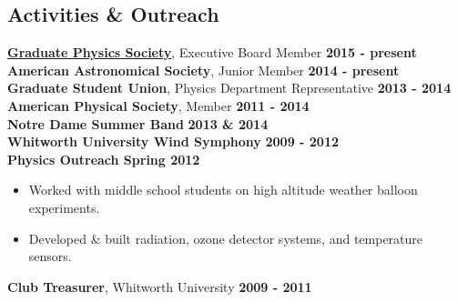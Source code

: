 \documentclass[margin]{res}
\begin{document}
\begin{resume}
\section{Activities \& Outreach}
{\bf \href{www.nd.edu/~gps}{Graduate Physics Society}}, Executive Board Member \hfill {\bf 2015 - present }\\
{\bf American Astronomical Society}, Junior Member  \hfill {\bf 2014 - present }\\
{\bf Graduate Student Union}, Physics Department Representative  \hfill {\bf 2013 - 2014 }\\
{\bf American Physical Society}, Member  \hfill {\bf 2011 - 2014 }\\
{\bf Notre Dame Summer Band} \hfill {\bf 2013 \&  2014 }\\
{\bf Whitworth University Wind Symphony}  \hfill {\bf 2009 - 2012 }\\
{\bf Physics Outreach \hfill  Spring 2012}
\begin{itemize}\itemsep -2pt
\item Worked with middle school students on high altitude weather balloon experiments.
\item Developed \& built radiation, ozone detector systems, and temperature sensors.
\end{itemize}
{\bf Club Treasurer}, Whitworth University \hfill {\bf2009 - 2011}









\end{resume}
\end{document}
